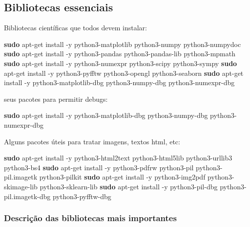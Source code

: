 \documentclass[11pt]{article}
\newenvironment{Shaded}{}{}
\newcommand{\KeywordTok}[1]{\textcolor[rgb]{0.00,0.44,0.13}{\textbf{{#1}}}}
\newcommand{\NormalTok}[1]{{#1}}
\begin{document}
    \subsection{Bibliotecas essenciais }\label{bibliotecas-essenciais}

Bibliotecas científicas que todos devem instalar:

\begin{Shaded}
\begin{Highlighting}[]
\KeywordTok{sudo} \NormalTok{apt-get install -y python3-matplotlib python3-numpy python3-numpydoc }
\KeywordTok{sudo} \NormalTok{apt-get install -y python3-pandas python3-pandas-lib python3-mpmath }
\KeywordTok{sudo} \NormalTok{apt-get install -y python3-numexpr python3-scipy python3-sympy}
\KeywordTok{sudo} \NormalTok{apt-get install -y python3-pyfftw python3-opengl python3-seaborn}
\KeywordTok{sudo} \NormalTok{apt-get install -y python3-matplotlib-dbg python3-numpy-dbg python3-numexpr-dbg}
\end{Highlighting}
\end{Shaded}

seus pacotes para permitir debugs:

\begin{Shaded}
\begin{Highlighting}[]
\KeywordTok{sudo} \NormalTok{apt-get install -y python3-matplotlib-dbg python3-numpy-dbg python3-numexpr-dbg}
\end{Highlighting}
\end{Shaded}

Alguns pacotes úteis para tratar imagens, textos html, etc:

\begin{Shaded}
\begin{Highlighting}[]
\KeywordTok{sudo} \NormalTok{apt-get install -y python3-html2text python3-html5lib python3-urllib3 python3-bs4 }
\KeywordTok{sudo} \NormalTok{apt-get install -y python3-pdfrw python3-pil python3-pil.imagetk python3-pilkit}
\KeywordTok{sudo} \NormalTok{apt-get install -y python3-img2pdf python3-skimage-lib python3-sklearn-lib }
\KeywordTok{sudo} \NormalTok{apt-get install -y python3-pil-dbg python3-pil.imagetk-dbg python3-pyfftw-dbg }
\end{Highlighting}
\end{Shaded}

\subsubsection{Descrição das bibliotecas mais
importantes}\label{descriuxe7uxe3o-das-bibliotecas-mais-importantes}
\end{document}
